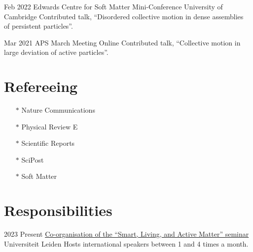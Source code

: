 \documentclass[a4paper]{cvtemplate_en} %
\begin{document}
\begin{cvbody}
\cvitem
	{Feb 2022}
	{}
	{Edwards Centre for Soft Matter Mini-Conference}
	{University of Cambridge }
	{}{}{}
	{}
	{Contributed talk, ``Disordered collective motion in dense assemblies\\ of persistent particles''.\\}


\cvitem
	{Mar 2021}
	{}
	{APS March Meeting}
	{Online \faGlobe}
	{}{}{}
	{}
	{Contributed talk, ``Collective motion in large deviation of active particles''.\\}

\end{cvbody}


\section{Refereeing}

\begin{itemize}
    \item[$\ast$] Nature Communications
    \item[$\ast$] Physical Review E
    \item[$\ast$] Scientific Reports
    \item[$\ast$] SciPost
    \item[$\ast$] Soft Matter
\end{itemize}
\vspace{25pt}


\section{Responsibilities}

\begin{cvbody}

\cvitem
	{2023}
	{Present}
	{\href{https://slam-leiden.nl}{Co-organisation of the ``Smart, Living, and Active Matter'' seminar}}
	{Universiteit Leiden \vspace{-5pt}}
	{}{}{}
    {}
	{Hosts international speakers between 1 and 4 times a month.}

\end{cvbody}
\end{document}
